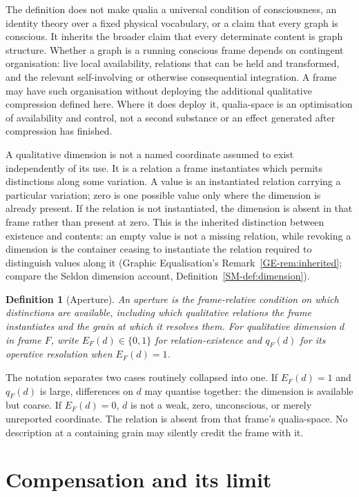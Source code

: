 \documentclass[11pt,a4paper]{article}
\newtheorem{definition}{Definition}[section]
\theoremstyle{remark}\newtheorem{remark}[definition]{Remark}
\begin{document}
The definition does not make qualia a universal condition of consciousness, an
identity theory over a fixed physical vocabulary, or a claim that every graph is
conscious. It inherits the broader claim that every determinate content is graph
structure. Whether a graph is a running conscious frame depends on contingent
organisation: live local availability, relations that can be held and transformed,
and the relevant self-involving or otherwise consequential integration. A frame
may have such organisation without deploying the additional qualitative
compression defined here. Where it does deploy it, qualia-space is an optimisation
of availability and control, not a second substance or an effect generated after
compression has finished.

A qualitative dimension is not a named coordinate assumed to exist independently
of its use. It is a relation a frame instantiates which permits distinctions along
some variation. A value is an instantiated relation carrying a particular
variation; zero is one possible value only where the dimension is already present.
If the relation is not instantiated, the dimension is absent in that frame rather
than present at zero. This is the inherited distinction between existence and
contents: an empty value is not a missing relation, while revoking a dimension is
the container ceasing to instantiate the relation required to distinguish values
along it (Graphic Equalisation's Remark~\ref{GE-rem:inherited}; compare the
Seldon dimension account, Definition~\ref{SM-def:dimension}).

\begin{definition}[Aperture]\label{def:aperture}
An \emph{aperture} is the frame-relative condition on which distinctions are
available, including which qualitative relations the frame instantiates and the
grain at which it resolves them. For qualitative dimension $d$ in frame $F$,
write $E_F(d)\in\{0,1\}$ for relation-existence and $q_F(d)$ for its operative
resolution when $E_F(d)=1$.
\end{definition}

The notation separates two cases routinely collapsed into one. If $E_F(d)=1$ and
$q_F(d)$ is large, differences on $d$ may quantise together: the dimension is
available but coarse. If $E_F(d)=0$, $d$ is not a weak, zero, unconscious, or
merely unreported coordinate. The relation is absent from that frame's
qualia-space. No description at a containing grain may silently credit the frame
with it.

\section{Compensation and its limit}\label{sec:compensation}
\end{document}
